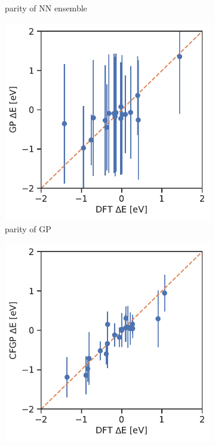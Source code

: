 \documentclass[]{achemso}
\begin{document}
\begin{figure}
\begin{subfigure}[b]{0.32\textwidth}
        \caption{parity of \gls{NN} ensemble}\label{fig:error_bar_ensemble}
    \end{subfigure}
    \begin{subfigure}[b]{0.32\textwidth}
        \includegraphics[width=\textwidth]{../GP/Matern/error_bar_parity.pdf}
        \caption{parity of \gls{GP}}\label{fig:error_bar_gp}
    \end{subfigure}
    \begin{subfigure}[b]{0.32\textwidth}
        \includegraphics[width=\textwidth]{../CFGP/Matern/error_bar_parity.pdf}

\end{subfigure}
\end{figure}
\end{document}
